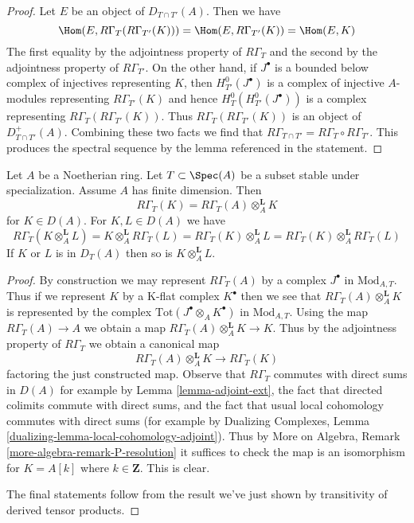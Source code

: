 \begin{proof}
Let $E$ be an object of $D_{T \cap T'}(A)$. Then we have
$$
\Hom(E, R\Gamma_T(R\Gamma_{T'}(K))) =
\Hom(E, R\Gamma_{T'}(K)) =
\Hom(E, K)
$$
The first equality by the adjointness property of $R\Gamma_T$
and the second by the adjointness property of $R\Gamma_{T'}$.
On the other hand, if $J^\bullet$ is a bounded below complex
of injectives representing $K$, then $H^0_{T'}(J^\bullet)$
is a complex of injective $A$-modules representing $R\Gamma_{T'}(K)$
and hence $H^0_T(H^0_{T'}(J^\bullet))$ is a complex representing
$R\Gamma_T(R\Gamma_{T'}(K))$. Thus $R\Gamma_T(R\Gamma_{T'}(K))$
is an object of $D^+_{T \cap T'}(A)$. Combining these two
facts we find that $R\Gamma_{T \cap T'} = R\Gamma_T \circ R\Gamma_{T'}$.
This produces the spectral sequence by the lemma referenced
in the statement.
\end{proof}

\begin{lemma}
\label{lemma-torsion-tensor-product}
Let $A$ be a Noetherian ring. Let $T \subset \Spec(A)$ be a subset
stable under specialization. Assume $A$ has finite dimension. Then
$$
R\Gamma_T(K) = R\Gamma_T(A) \otimes_A^\mathbf{L} K
$$
for $K \in D(A)$. For $K, L \in D(A)$ we have
$$
R\Gamma_T(K \otimes_A^\mathbf{L} L) =
K \otimes_A^\mathbf{L} R\Gamma_T(L) =
R\Gamma_T(K) \otimes_A^\mathbf{L} L =
R\Gamma_T(K) \otimes_A^\mathbf{L} R\Gamma_T(L)
$$
If $K$ or $L$ is in $D_T(A)$ then so is $K \otimes_A^\mathbf{L} L$.
\end{lemma}

\begin{proof}
By construction we may represent $R\Gamma_T(A)$ by a complex $J^\bullet$ in
$\text{Mod}_{A, T}$. Thus if we represent $K$ by a K-flat complex $K^\bullet$
then we see that $R\Gamma_T(A) \otimes_A^\mathbf{L} K$ is represented
by the complex $\text{Tot}(J^\bullet \otimes_A K^\bullet)$ in
$\text{Mod}_{A, T}$. Using the map $R\Gamma_T(A) \to A$ we obtain
a map $R\Gamma_T(A) \otimes_A^\mathbf{L} K\to K$. Thus by the adjointness
property of $R\Gamma_T$ we obtain a canonical map
$$
R\Gamma_T(A) \otimes_A^\mathbf{L} K \longrightarrow R\Gamma_T(K)
$$
factoring the just constructed map. Observe that $R\Gamma_T$ commutes
with direct sums in $D(A)$ for example by Lemma \ref{lemma-adjoint-ext},
the fact that directed colimits commute with direct sums, and the
fact that usual local cohomology commutes with direct sums
(for example by Dualizing Complexes, Lemma
\ref{dualizing-lemma-local-cohomology-adjoint}).
Thus by More on Algebra, Remark \ref{more-algebra-remark-P-resolution}
it suffices to check the map is an isomorphism for
$K = A[k]$ where $k \in \mathbf{Z}$. This is clear.

\medskip\noindent
The final statements follow from the result we've just shown
by transitivity of derived tensor products.
\end{proof}





